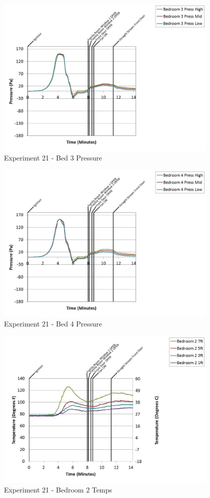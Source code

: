 \documentclass{article}
\begin{document}
\begin{appendices}
	\begin{figure}[h!]
		\centering
		\includegraphics[height=3.05in]{0_Images/Results_Charts/Exp_21_Charts/Bed3Pressure.pdf}
		\caption{Experiment 21 - Bed 3 Pressure}
	\end{figure}
 
	\clearpage

	\begin{figure}[h!]
		\centering
		\includegraphics[height=3.05in]{0_Images/Results_Charts/Exp_21_Charts/Bed4Pressure.pdf}
		\caption{Experiment 21 - Bed 4 Pressure}
	\end{figure}
 

	\begin{figure}[h!]
		\centering
		\includegraphics[height=3.05in]{0_Images/Results_Charts/Exp_21_Charts/Bedroom2Temps.pdf}
		\caption{Experiment 21 - Bedroom 2 Temps}
	\end{figure}
 

\end{appendices}
\end{document}
